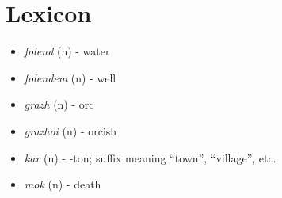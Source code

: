 \documentclass[main.tex]{subfiles}
\newcommand{\lexitem}[3]{\item \textit{#1} (#2) - #3}
\begin{document}
\section{Lexicon}
\begin{itemize}
    \lexitem{folend}{n}{water}
    \lexitem{folendem}{n}{well}
    \lexitem{grazh}{n}{orc}
    \lexitem{grazhoi}{n}{orcish}
    \lexitem{kar}{n}{-ton; suffix meaning ``town'', ``village'', etc.}
    \lexitem{mok}{n}{death}
\end{itemize}
\end{document}
